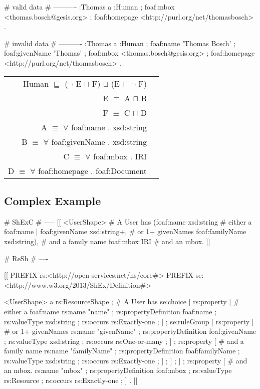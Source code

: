 \documentclass{llncs}
\newenvironment{DL}{
	\begin{center}
  \begin{tabular}{r l}

}{
  \end{tabular}
	\end{center}
}
\begin{document}
\begin{ex}
# valid data
# ----------
:Thomas
    a :Human ;
    foaf:mbox <thomas.bosch@gesis.org> ;
    foaf:homepage <http://purl.org/net/thomasbosch> .
\end{ex}

\begin{ex}
# invalid data
# ----------
:Thomas
    a :Human ;
    foaf:name 'Thomas Bosch' ;
    foaf:givenName 'Thomas' ;
    foaf:mbox <thomas.bosch@gesis.org> ;
    foaf:homepage <http://purl.org/net/thomasbosch> .
\end{ex}

\begin{DL}
Human $\sqsubseteq$ ($\neg$ E $\sqcap$ F) $\sqcup$ (E $\sqcap$ $\neg$ F) \\ 
E $\equiv$ A $\sqcap$ B \\
F $\equiv$ C $\sqcap$ D \\
A $\equiv$ $\forall$ foaf:name . xsd:string \\
B $\equiv$ $\forall$ foaf:givenName . xsd:string \\ 
C $\equiv$ $\forall$ foaf:mbox . IRI \\
D $\equiv$ $\forall$ foaf:homepage . foaf:Document \\
\end{DL}

\subsection{Complex Example}

\begin{ex}
# ShExC
# -----
[[
  <UserShape> {                          # A User has
    (foaf:name xsd:string                #  either a foaf:name
     | foaf:givenName xsd:string+,       #   or 1+ givenNames
       foaf:familyName xsd:string),      #   and a family name
    foaf:mbox IRI                        # and an mbox.
  }
]]
\end{ex}

\begin{ex}
# ReSh
# ----

[[
  PREFIX rs:<http://open-services.net/ns/core#>
  PREFIX se:<http://www.w3.org/2013/ShEx/Definition#>

  <UserShape> a rs:ResourceShape ;       # A User has
    se:choice [
      rs:property [                      #  either a foaf:name
        rs:name "name" ;
        rs:propertyDefinition foaf:name ;
        rs:valueType xsd:string ;
        rs:occurs rs:Exactly-one ;
      ] ;
      se:ruleGroup [
        rs:property [                    #   or 1+ givenNames
          rs:name "givenName" ;
          rs:propertyDefinition foaf:givenName ;
          rs:valueType xsd:string ;
          rs:occurs rs:One-or-many ;
        ] ;
        rs:property [                    #   and a family name
          rs:name "familyName" ;
          rs:propertyDefinition foaf:familyName ;
          rs:valueType xsd:string ;
          rs:occurs rs:Exactly-one ;
        ] ;
      ] ;
    ] ;
    rs:property [                        # and an mbox.
      rs:name "mbox" ;
      rs:propertyDefinition foaf:mbox ;
      rs:valueType rs:Resource ;
      rs:occurs rs:Exactly-one ;
    ] .
]]
\end{ex}
\end{document}
